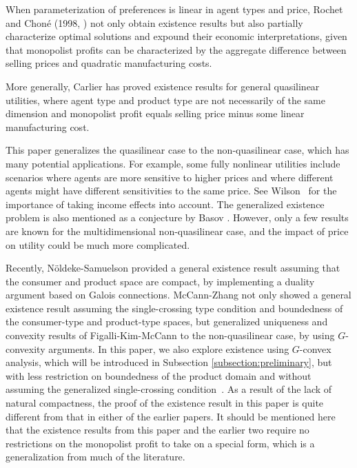 \documentclass[a4paper, 11pt]{amsart}
\numberwithin{equation}{section}
\theoremstyle{plain}
\theoremstyle{definition}
\theoremstyle{remark}
\begin{document}
When parameterization of preferences is linear in agent types and price, Rochet and Chon\'e (1998, \cite{RochetChone98}) not only obtain existence results but also partially characterize optimal solutions and expound their economic interpretations, %
given that monopolist profits can be characterized by {the aggregate difference between selling prices and quadratic manufacturing costs.}\medskip

More generally, Carlier \cite{Carlier01} has proved existence results for general quasilinear utilities, where agent type and product type are not necessarily of the same dimension and monopolist profit equals selling price minus some linear manufacturing cost.\medskip

This paper generalizes the quasilinear case to the non-quasilinear case, which has many potential applications. For example, some fully nonlinear utilities include scenarios where agents are more sensitive to higher prices and where different agents might have different sensitivities to the same price. %
See Wilson~\cite[Chapter 7]{Wilson93} for the importance of taking income effects into account. 
The generalized existence problem is also mentioned as a conjecture by Basov \cite[Chapter~8]{Basov05}. However, only a few results are known for the multidimensional non-quasilinear case, and the impact of price on utility could be much more complicated.\medskip


Recently, N\"oldeke-Samuelson \cite{NoldekeSamuelson15p} provided a general existence result assuming that the consumer and product space are compact, by implementing a duality argument based on Galois connections. McCann-Zhang \cite{McCannZhang17} not only showed a general existence result assuming the single-crossing type condition and
boundedness of the consumer-type and product-type spaces, %
but generalized uniqueness and convexity results of Figalli-Kim-McCann \cite{FigalliKimMcCann11} to the non-quasilinear case, by using $G$-convexity arguments. In this paper, we also explore existence using $G$-convex analysis, which will be introduced in Subsection \ref{subsection:preliminary}, but with less restriction on boundedness of the product domain and without assuming the generalized single-crossing condition~\cite{McAfeeMcMillan88}. As a result of the lack of natural compactness, the proof of the existence result in this paper is quite different from that in either of the %
earlier papers. It should be mentioned here that the existence results from this paper and the earlier two require no restrictions on the monopolist profit to take on a special
form, which is a generalization from much of the literature.\medskip
\end{document}
